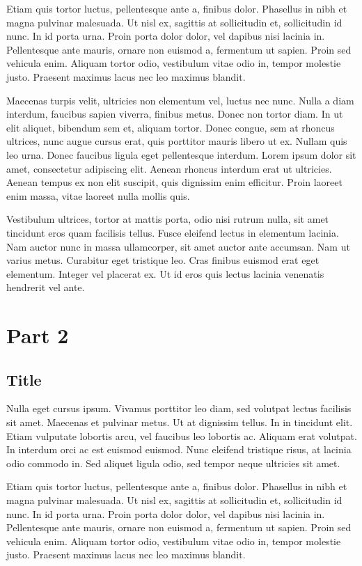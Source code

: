 \documentclass[
  a5paper,
  smalldemyvopaper,10pt,twoside,onecolumn,openright,extrafontsizes,hidelinks]{memoir}
\begin{document}
Etiam quis tortor luctus, pellentesque ante a, finibus dolor. Phasellus
in nibh et magna pulvinar malesuada. Ut nisl ex, sagittis at
sollicitudin et, sollicitudin id nunc. In id porta urna. Proin porta
dolor dolor, vel dapibus nisi lacinia in. Pellentesque ante mauris,
ornare non euismod a, fermentum ut sapien. Proin sed vehicula enim.
Aliquam tortor odio, vestibulum vitae odio in, tempor molestie justo.
Praesent maximus lacus nec leo maximus blandit.

Maecenas turpis velit, ultricies non elementum vel, luctus nec nunc.
Nulla a diam interdum, faucibus sapien viverra, finibus metus. Donec non
tortor diam. In ut elit aliquet, bibendum sem et, aliquam tortor. Donec
congue, sem at rhoncus ultrices, nunc augue cursus erat, quis porttitor
mauris libero ut ex. Nullam quis leo urna. Donec faucibus ligula eget
pellentesque interdum. Lorem ipsum dolor sit amet, consectetur
adipiscing elit. Aenean rhoncus interdum erat ut ultricies. Aenean
tempus ex non elit suscipit, quis dignissim enim efficitur. Proin
laoreet enim massa, vitae laoreet nulla mollis quis.

Vestibulum ultrices, tortor at mattis porta, odio nisi rutrum nulla, sit
amet tincidunt eros quam facilisis tellus. Fusce eleifend lectus in
elementum lacinia. Nam auctor nunc in massa ullamcorper, sit amet auctor
ante accumsan. Nam ut varius metus. Curabitur eget tristique leo. Cras
finibus euismod erat eget elementum. Integer vel placerat ex. Ut id eros
quis lectus lacinia venenatis hendrerit vel ante.

\part{Part 2}

\chapter{Title}\label{title-3}

Nulla eget cursus ipsum. Vivamus porttitor leo diam, sed volutpat lectus
facilisis sit amet. Maecenas et pulvinar metus. Ut at dignissim tellus.
In in tincidunt elit. Etiam vulputate lobortis arcu, vel faucibus leo
lobortis ac. Aliquam erat volutpat. In interdum orci ac est euismod
euismod. Nunc eleifend tristique risus, at lacinia odio commodo in. Sed
aliquet ligula odio, sed tempor neque ultricies sit amet.

Etiam quis tortor luctus, pellentesque ante a, finibus dolor. Phasellus
in nibh et magna pulvinar malesuada. Ut nisl ex, sagittis at
sollicitudin et, sollicitudin id nunc. In id porta urna. Proin porta
dolor dolor, vel dapibus nisi lacinia in. Pellentesque ante mauris,
ornare non euismod a, fermentum ut sapien. Proin sed vehicula enim.
Aliquam tortor odio, vestibulum vitae odio in, tempor molestie justo.
Praesent maximus lacus nec leo maximus blandit.
\end{document}
